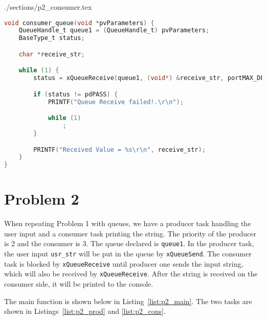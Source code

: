 \begin{filecontents}[overwrite]{./sections/p2_consumer.tex}
\begin{lstlisting}[language=c,caption=Problem 2 Consumer Queue, label=list:p2_cons]
void consumer_queue(void *pvParameters) {
    QueueHandle_t queue1 = (QueueHandle_t) pvParameters;
    BaseType_t status;

    char *receive_str;

    while (1) {
        status = xQueueReceive(queue1, (void*) &receive_str, portMAX_DELAY);

        if (status != pdPASS) {
            PRINTF("Queue Receive failed!.\r\n");

            while (1)
                ;
        }

        PRINTF("Received Value = %s\r\n", receive_str);
    }
}    
\end{lstlisting}
\end{filecontents}

\section*{Problem 2}
When repeating Problem 1 with queues, we have a producer task handling the user input and a consumer task printing the string. The priority of the producer is 2 and the consumer is 3. The queue declared is \texttt{queue1}. In the producer task, the user input \texttt{usr\_str} will be put in the queue by \texttt{xQueueSend}. The consumer task is blocked by \texttt{xQueueReceive} until producer one sends the input string, which will also be received by \texttt{xQueueReceive}. After the string is received on the consumer side, it will be printed to the console.

The main function is shown below in Listing~\ref{list:p2_main}. The two tasks are shown in Listings~\ref{list:p2_prod} and \ref{list:p2_cons}.



